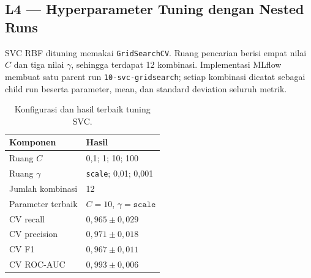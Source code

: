 \documentclass[11pt,a4paper]{article}
\begin{document}
\begin{center}
\end{center}

\subsection{L4 --- Hyperparameter Tuning dengan Nested Runs}

SVC RBF dituning memakai \texttt{GridSearchCV}. Ruang pencarian berisi empat nilai $C$ dan tiga nilai $\gamma$, sehingga terdapat 12 kombinasi. Implementasi MLflow membuat satu parent run \texttt{10-svc-gridsearch}; setiap kombinasi dicatat sebagai child run beserta parameter, mean, dan standard deviation seluruh metrik.

\begin{table}[ht]
\centering
\caption{Konfigurasi dan hasil terbaik tuning SVC.}
\begin{tabular}{ll}
\toprule
Komponen & Hasil \\
\midrule
Ruang $C$ & 0,1; 1; 10; 100 \\
Ruang $\gamma$ & \texttt{scale}; 0,01; 0,001 \\
Jumlah kombinasi & 12 \\
Parameter terbaik & $C=10$, $\gamma=\texttt{scale}$ \\
CV recall & $0{,}965 \pm 0{,}029$ \\
CV precision & $0{,}971 \pm 0{,}018$ \\
CV F1 & $0{,}967 \pm 0{,}011$ \\
CV ROC-AUC & $0{,}993 \pm 0{,}006$ \\
\bottomrule
\end{tabular}
\end{table}
\end{document}
